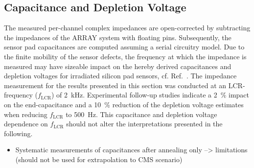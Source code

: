 \subsection{Capacitance and Depletion Voltage}
\label{subsec:Udep}

The measured per-channel complex impedances are open-corrected by subtracting the impedances of the ARRAY system with floating pins.
Subsequently, the sensor pad capacitances are computed assuming a serial circuitry model.
Due to the finite mobility of the sensor defects, the frequency at which the impedance is measured may have sizeable impact on the hereby derived capacitances and depletion voltages for irradiated silicon pad sensors, cf. Ref.~\cite{Li1991}.
The impedance measurement for the results presented in this section was conducted at an LCR-frequency ($f_\text{LCR}$) of \SI{2}{\kilo\hertz}.
Experimental follow-up studies indicate a \SI{2}{\percent} impact on the end-capacitance and a \SI{10}{\percent} reduction of the depletion voltage estimates when reducing $f_\text{LCR}$ to \SI{500}{\hertz}.
This capacitance and depletion voltage dependence on $f_\text{LCR}$ should not alter the interpretations presented in the following.

\begin{itemize}
	\item Systematic measurements of capacitances after annealing only --> limitations (should not be used for extrapolation to CMS scenario)
\end{itemize}



